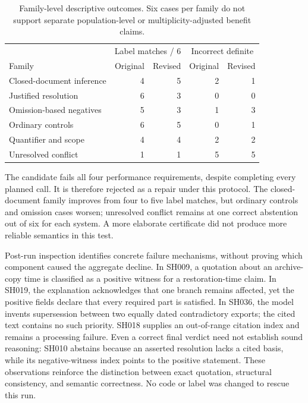 \begin{table}[htbp]
\centering
\begin{tabular}{@{}lrrrr@{}}
\toprule
& \multicolumn{2}{c}{Label matches / 6} & \multicolumn{2}{c}{Incorrect definite}\\
Family & Original & Revised & Original & Revised\\\midrule
Closed-document inference & 4 & 5 & 2 & 1\\
Justified resolution & 6 & 3 & 0 & 0\\
Omission-based negatives & 5 & 3 & 1 & 3\\
Ordinary controls & 6 & 5 & 0 & 1\\
Quantifier and scope & 4 & 4 & 2 & 2\\
Unresolved conflict & 1 & 1 & 5 & 5\\
\bottomrule
\end{tabular}
\caption{Family-level descriptive outcomes. Six cases per family do not support separate population-level or multiplicity-adjusted benefit claims.}
\label{tab:revised-semantic-families}
\end{table}

The candidate fails all four performance requirements, despite completing every planned call. It is therefore rejected as a repair under this protocol. The closed-document family improves from four to five label matches, but ordinary controls and omission cases worsen; unresolved conflict remains at one correct abstention out of six for each system. A more elaborate certificate did not produce more reliable semantics in this test.

Post-run inspection identifies concrete failure mechanisms, without proving which component caused the aggregate decline. In SH009, a quotation about an archive-copy time is classified as a positive witness for a restoration-time claim. In SH019, the explanation acknowledges that one branch remains affected, yet the positive fields declare that every required part is satisfied. In SH036, the model invents supersession between two equally dated contradictory exports; the cited text contains no such priority. SH018 supplies an out-of-range citation index and remains a processing failure. Even a correct final verdict need not establish sound reasoning: SH010 abstains because an asserted resolution lacks a cited basis, while its negative-witness index points to the positive statement. These observations reinforce the distinction between exact quotation, structural consistency, and semantic correctness. No code or label was changed to rescue this run.

